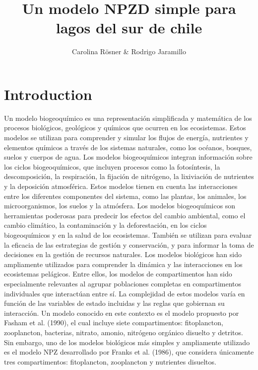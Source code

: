 \documentclass{article}
\title{Un modelo NPZD simple para lagos del sur de chile}
\author{Carolina Rösner &
Rodrigo Jaramillo}
\begin{document}
\maketitle

\begin{abstract}
\end{abstract}

\section{Introduction}

Un modelo biogeoquímico es una representación simplificada y matemática de los procesos biológicos, geológicos y químicos que ocurren en los ecosistemas. Estos modelos se utilizan para comprender y simular los flujos de energía, nutrientes y elementos químicos a través de los sistemas naturales, como los océanos, bosques, suelos y cuerpos de agua.
Los modelos biogeoquímicos integran información sobre los ciclos biogeoquímicos, que incluyen procesos como la fotosíntesis, la descomposición, la respiración, la fijación de nitrógeno, la lixiviación de nutrientes y la deposición atmosférica. Estos modelos tienen en cuenta las interacciones entre los diferentes componentes del sistema, como las plantas, los animales, los microorganismos, los suelos y la atmósfera.
Los modelos biogeoquímicos son herramientas poderosas para predecir los efectos del cambio ambiental, como el cambio climático, la contaminación y la deforestación, en los ciclos biogeoquímicos y en la salud de los ecosistemas. También se utilizan para evaluar la eficacia de las estrategias de gestión y conservación, y para informar la toma de decisiones en la gestión de recursos naturales.
Los modelos biológicos han sido ampliamente utilizados para comprender la dinámica y las interacciones en los ecosistemas pelágicos. Entre ellos, los modelos de compartimentos han sido especialmente relevantes al agrupar poblaciones completas en compartimentos individuales que interactúan entre sí. La complejidad de estos modelos varía en función de las variables de estado incluidas y las reglas que gobiernan su interacción.
Un modelo conocido en este contexto es el modelo propuesto por Fasham et al. (1990), el cual incluye siete compartimentos: fitoplancton, zooplancton, bacterias, nitrato, amonio, nitrógeno orgánico disuelto y detritos. Sin embargo, uno de los modelos biológicos más simples y ampliamente utilizado es el modelo NPZ desarrollado por Franks et al. (1986), que considera únicamente tres compartimentos: fitoplancton, zooplancton y nutrientes disueltos.
\end{document}
